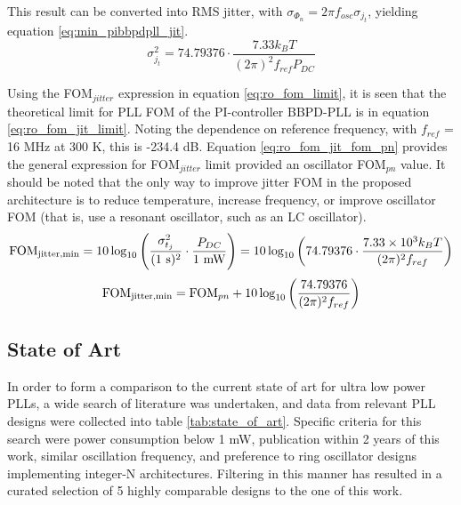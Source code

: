 	 This result can be converted into RMS jitter, with $\sigma_{\Phi_{n}} = 2\pi f_{osc}\sigma_{j_t}$, yielding equation \ref{eq:min_pibbpdpll_jit}.
	\begin{equation}\label{eq:min_pibbpdpll_jit}
		\sigma_{j_t}^2 = 74.79376\cdot  \frac{7.33 k_B T}{(2\pi)^2f_{ref}P_{DC}}
	\end{equation}


	  Using the FOM$_{jitter}$ expression in equation \ref{eq:ro_fom_limit}, it is seen that the theoretical limit for PLL FOM of the PI-controller BBPD-PLL is in equation \ref{eq:ro_fom_jit_limit}. Noting the dependence on reference frequency, with $f_{ref}$ = 16 MHz at 300 K, this is -234.4 dB. Equation \ref{eq:ro_fom_jit_fom_pn} provides the general expression for FOM$_{jitter}$ limit provided an oscillator FOM$_{pn}$ value. It should be noted that the only way to improve jitter FOM in the proposed architecture is to reduce temperature, increase frequency, or improve oscillator FOM (that is, use a resonant oscillator, such as an LC oscillator).
	\begin{equation}\label{eq:ro_fom_jit_limit}
		\textnormal{FOM}_{\textnormal{jitter,min}} = 10\log_{10}\left(\frac{\sigma_{t_j}^2}{(\textnormal{1 s})^2}\cdot\frac{P_{DC}}{\textnormal{1 mW}}\right) =  10\log_{10}\left( 74.79376\cdot  \frac{7.33\times 10^3 k_B T}{(2\pi)^2f_{ref}} \right)
	\end{equation}
	\begin{equation}\label{eq:ro_fom_jit_fom_pn}
		\textnormal{FOM}_{\textnormal{jitter,min}} = \textnormal{FOM}_{pn} + 10\log_{10}\left(\frac{74.79376}{(2\pi)^2 f_{ref}} \right)
	\end{equation}

\subsection{State of Art}

In order to form a comparison to the current state of art for ultra low power PLLs, a wide search of literature was undertaken, and data from relevant PLL designs were collected into table \ref{tab:state_of_art}. Specific criteria for this search were power consumption below 1 mW, publication within 2 years of this work, similar oscillation frequency, and preference to ring oscillator designs implementing integer-N architectures. Filtering in this manner has resulted in a curated selection of 5 highly comparable designs to the one of this work.

